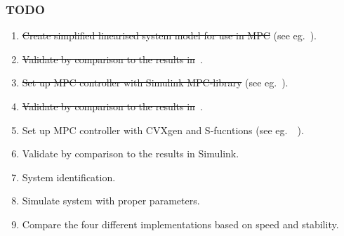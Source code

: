 \documentclass{article}
\begin{document}
\subsubsection*{TODO}
\begin{enumerate}
\item \sout{Create simplified linearised system model for use in MPC} (see eg.~\cite{Bouffard:EECS-2012-241}).
\item \sout{Validate by comparison to the results in}~\cite{Bouffard:EECS-2012-241}.
\item \sout{Set up MPC controller with Simulink MPC-library} (see eg.~\cite{Bouffard:EECS-2012-241}).
\item \sout{Validate by comparison to the results in}~\cite{Bouffard:EECS-2012-241}.
\item Set up MPC controller with CVXgen and S-fucntions (see eg.~\cite{Bouffard:EECS-2012-241}~\cite{mattingley2012cvxgen}).
\item Validate by comparison to the results in Simulink.
\item System identification.
\item Simulate system with proper parameters.
\item Compare the four different implementations based on speed and stability.
\end{enumerate}
\end{document}
